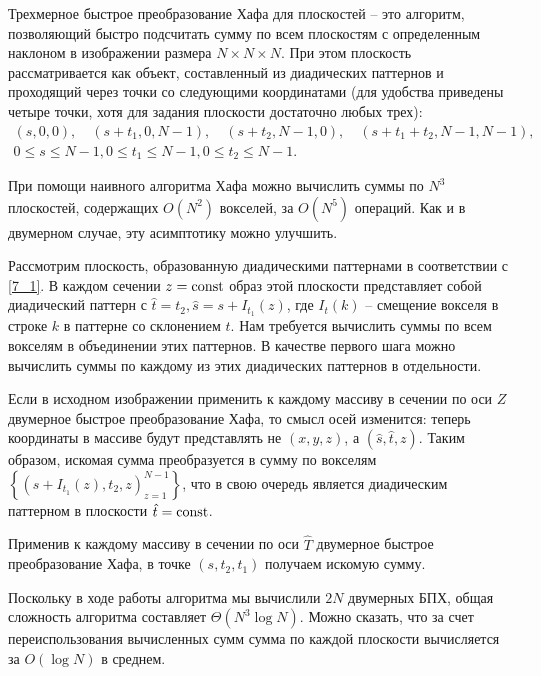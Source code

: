
Трехмерное быстрое преобразование Хафа для плоскостей -- это алгоритм, позволяющий быстро подсчитать сумму по всем плоскостям с определенным наклоном в изображении размера $N \times N \times N$. При этом плоскость рассматривается как объект, составленный из диадических паттернов и проходящий через точки со следующими координатами (для удобства приведены четыре точки, хотя для задания плоскости достаточно любых трех):
\begin{gather}
\label{7_1}
    (s, 0, 0), \quad
    (s + t_1, 0, N-1), \quad
    (s + t_2, N-1, 0), \quad
    (s + t_1 + t_2, N-1, N-1), \\
\nonumber
    0 \le s \le N-1,
    0 \le t_1 \le N-1,
    0 \le t_2 \le N-1.
\end{gather}

При помощи наивного алгоритма Хафа можно вычислить суммы по $N^3$ плоскостей, содержащих $O(N^2)$ вокселей, за $O(N^5)$ операций. Как и в двумерном случае, эту асимптотику можно улучшить.

Рассмотрим плоскость, образованную диадическими паттернами в соответствии с \eqref{7_1}. В каждом сечении $z = \mathrm{const}$ образ этой плоскости представляет собой диадический паттерн с $\hat{t} = t_2, \hat{s} = s + I_{t_1}(z)$, где $I_{t}(k)$ -- смещение вокселя в строке $k$ в паттерне со склонением $t$. Нам требуется вычислить суммы по всем вокселям в объединении этих паттернов. В качестве первого шага можно вычислить суммы по каждому из этих диадических паттернов в отдельности.

Если в исходном изображении применить к каждому массиву в сечении по оси $Z$ двумерное быстрое преобразование Хафа, то смысл осей изменится: теперь координаты в массиве будут представлять не $(x, y, z)$, а $(\hat{s}, \hat{t}, z)$. Таким образом, искомая сумма преобразуется в сумму по вокселям $\left\{ \left( s + I_{t_1}(z), t_2, z \right)_{z=1}^{N-1} \right\}$, что в свою очередь является диадическим паттерном в плоскости $\hat{t} = \mathrm{const}$.

Применив к каждому массиву в сечении по оси $\hat{T}$ двумерное быстрое преобразование Хафа, в точке $\left( s, t_2, t_1 \right)$ получаем искомую сумму.

Поскольку в ходе работы алгоритма мы вычислили $2N$ двумерных БПХ, общая сложность алгоритма составляет $\Theta\left( N^3 \log N \right)$. Можно сказать, что за счет переиспользования вычисленных сумм сумма по каждой плоскости вычисляется за $O(\log N)$ в среднем.
